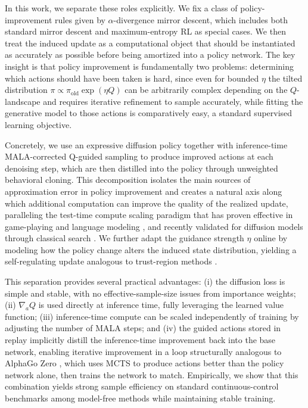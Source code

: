 \documentclass{article}
\theoremstyle{plain}
\theoremstyle{definition}
\theoremstyle{remark}
\begin{document}
In this work, we separate these roles explicitly. We fix a class of policy-improvement rules given by $\alpha$-divergence mirror descent, which includes both standard mirror descent and maximum-entropy RL as special cases. We then treat the induced update as a computational object that should be instantiated as accurately as possible before being amortized into a policy network. The key insight is that policy improvement is fundamentally two problems: determining which actions should have been taken is hard, since even for bounded $\eta$ the tilted distribution $\pi \propto \pi_{\mathrm{old}} \exp(\eta Q)$ can be arbitrarily complex depending on the $Q$-landscape and requires iterative refinement to sample accurately, while fitting the generative model to those actions is comparatively easy, a standard supervised learning objective.

Concretely, we use an expressive diffusion policy together with inference-time MALA-corrected Q-guided sampling to produce improved actions at each denoising step, which are then distilled into the policy through unweighted behavioral cloning. This decomposition isolates the main sources of approximation error in policy improvement and creates a natural axis along which additional computation can improve the quality of the realized update, paralleling the test-time compute scaling paradigm that has proven effective in game-playing \citep{silver2017mastering} and language modeling \citep{snell2024scaling}, and recently validated for diffusion models through classical search \citep{zhang2025inference}. We further adapt the guidance strength $\eta$ online by modeling how the policy change alters the induced state distribution, yielding a self-regulating update analogous to trust-region methods \citep{kakade2002approximately,schulman2015trust}.

This separation provides several practical advantages: (i) the diffusion loss is simple and stable, with no effective-sample-size issues from importance weights; (ii) $\nabla_a Q$ is used directly at inference time, fully leveraging the learned value function; (iii) inference-time compute can be scaled independently of training by adjusting the number of MALA steps; and (iv) the guided actions stored in replay implicitly distill the inference-time improvement back into the base network, enabling iterative improvement in a loop structurally analogous to AlphaGo Zero \citep{silver2017mastering}, which uses MCTS to produce actions better than the policy network alone, then trains the network to match. Empirically, we show that this combination yields strong sample efficiency on standard continuous-control benchmarks among model-free methods while maintaining stable training.
\end{document}
